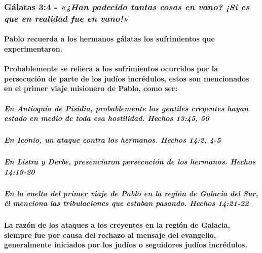 \documentclass[11a pt,twoside]{article}
\newcommand{\scripture}[1]{%
  {\fontsize{12pt}{16pt}\selectfont\ScriptureFont\itshape #1}%
}
\let\oldsubsubsection\subsubsection
\renewcommand{\subsubsection}{\needspace{4\baselineskip}\oldsubsubsection}
\let\oldparagraph\paragraph
\renewcommand{\paragraph}{\needspace{3\baselineskip}\oldparagraph}
\let\oldsubparagraph\subparagraph
\renewcommand{\subparagraph}{\needspace{2\baselineskip}\oldsubparagraph}
\begin{document}
\subsubsection{\texorpdfstring{Gálatas 3:4 -
\scripture{«¿Han padecido tantas cosas en vano? ¡Si es que en realidad fue en vano!»}}{Gálatas 3:4 - }}\label{guxe1latas-34---han-padecido-tantas-cosas-en-vano-si-es-que-en-realidad-fue-en-vano}

\paragraph{Pablo recuerda a los hermanos gálatas los sufrimientos que
experimentaron.}\label{pablo-recuerda-a-los-hermanos-guxe1latas-los-sufrimientos-que-experimentaron.}

\paragraph{Probablemente se refiera a los sufrimientos ocurridos por la
persecución de parte de los judíos incrédulos, estos son mencionados en
el primer viaje misionero de Pablo, como
ser:}\label{probablemente-se-refiera-a-los-sufrimientos-ocurridos-por-la-persecuciuxf3n-de-parte-de-los-juduxedos-incruxe9dulos-estos-son-mencionados-en-el-primer-viaje-misionero-de-pablo-como-ser}

\subparagraph{En Antioquía de Pisidia, probablemente los gentiles
creyentes hayan estado en medio de toda esa hostilidad. Hechos 13:45,
50}\label{en-antioquuxeda-de-pisidia-probablemente-los-gentiles-creyentes-hayan-estado-en-medio-de-toda-esa-hostilidad.-hechos-1345-50}

\subparagraph{En Iconio, un ataque contra los hermanos. Hechos 14:2,
4-5}\label{en-iconio-un-ataque-contra-los-hermanos.-hechos-142-4-5}

\subparagraph{En Listra y Derbe, presenciaron persecución de los
hermanos. Hechos
14:19-20}\label{en-listra-y-derbe-presenciaron-persecuciuxf3n-de-los-hermanos.-hechos-1419-20}

\subparagraph{En la vuelta del primer viaje de Pablo en la región de
Galacia del Sur, él menciona las tribulaciones que estaban pasando.
Hechos
14:21-22}\label{en-la-vuelta-del-primer-viaje-de-pablo-en-la-regiuxf3n-de-galacia-del-sur-uxe9l-menciona-las-tribulaciones-que-estaban-pasando.-hechos-1421-22}

\paragraph{La razón de los ataques a los creyentes en la región de
Galacia, siempre fue por causa del rechazo al mensaje del evangelio,
generalmente iniciados por los judíos o seguidores judíos
incrédulos.}\label{la-razuxf3n-de-los-ataques-a-los-creyentes-en-la-regiuxf3n-de-galacia-siempre-fue-por-causa-del-rechazo-al-mensaje-del-evangelio-generalmente-iniciados-por-los-juduxedos-o-seguidores-juduxedos-incruxe9dulos.}
\end{document}
